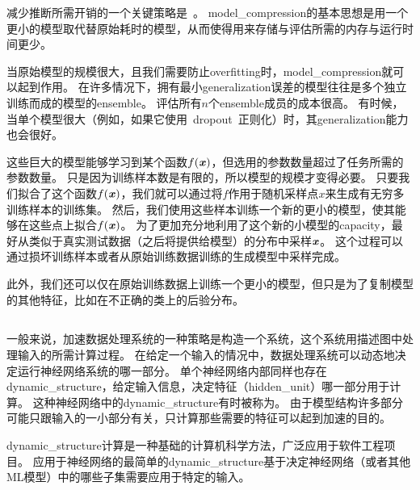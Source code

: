 减少推断所需开销的一个关键策略是~\citep{bucilua2006model}。
\gls{model_compression}的基本思想是用一个更小的模型取代替原始耗时的模型，从而使得用来存储与评估所需的内存与运行时间更少。



当原始模型的规模很大，且我们需要防止\gls{overfitting}时，\gls{model_compression}就可以起到作用。
在许多情况下，拥有最小\gls{generalization}误差的模型往往是多个独立训练而成的模型的\gls{ensemble}。
评估所有$n$个\gls{ensemble}成员的成本很高。
有时候，当单个模型很大（例如，如果它使用~\gls{dropout}~正则化）时，其\gls{generalization}能力也会很好。

这些巨大的模型能够学习到某个函数$f(\boldsymbol{\mathit{x}})$，但选用的参数数量超过了任务所需的参数数量。
只是因为训练样本数是有限的，所以模型的规模才变得必要。
只要我们拟合了这个函数$f(\boldsymbol{\mathit{x}})$，我们就可以通过将$f$作用于随机采样点$x$来生成有无穷多训练样本的训练集。
然后，我们使用这些样本训练一个新的更小的模型，使其能够在这些点上拟合$f(\boldsymbol{\mathit{x}})$。
为了更加充分地利用了这个新的小模型的\gls{capacity}，最好从类似于真实测试数据（之后将提供给模型）的分布中采样$\boldsymbol{\mathit{x}}$。
这个过程可以通过损坏训练样本或者从原始训练数据训练的生成模型中采样完成。

此外，我们还可以仅在原始训练数据上训练一个更小的模型，但只是为了复制模型的其他特征，比如在不正确的类上的后验分布\citep{Hinton-dark-2014,hinton2015distilling}。

\subsection{}
\label{sec:dynamic_structure}

一般来说，加速数据处理系统的一种策略是构造一个系统，这个系统用描述图中处理输入的所需计算过程。
在给定一个输入的情况中，数据处理系统可以动态地决定运行神经网络系统的哪一部分。
单个神经网络内部同样也存在\gls{dynamic_structure}，给定输入信息，决定特征（\gls{hidden_unit}）哪一部分用于计算。
这种神经网络中的\gls{dynamic_structure}有时被称为\citep{bengio2013estimating,bengio-arxiv13-condcomp}。
由于模型结构许多部分可能只跟输入的一小部分有关，只计算那些需要的特征可以起到加速的目的。

\gls{dynamic_structure}计算是一种基础的计算机科学方法，广泛应用于软件工程项目。
应用于神经网络的最简单的\gls{dynamic_structure}基于决定神经网络（或者其他\gls{ML}模型）中的哪些子集需要应用于特定的输入。

